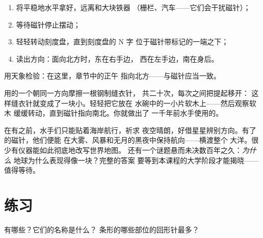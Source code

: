 \begin{method}[使用指南针]\label{met:g4:magnets-and-compass:use}
\begin{enumerate}
  \item 将平稳地水平拿好，远离和大块铁器
        （栅栏、汽车——它们会干扰磁针）；
  \item 等待磁针停止摆动；
  \item 轻轻转动刻度盘，直到刻度盘的 N 字
        位于磁针带标记的一端之下；
  \item 读出方向：面向北方时，东在右手边，
        西在左手边，南在身后。
\end{enumerate}
用天象检验：在这里，章节中的正午
指向北方——与磁针应当一致。
\end{method}

\begin{example}[自己动手做一个]\label{ex:g4:magnets-and-compass:make}
用的一个朝同一方向摩擦一根钢制缝衣针，
共二十次，每次之间把提起移开：
这样缝衣针就变成了一块小。轻轻把它放在
水碗中的一小片软木上——然后观察软木
缓缓转动，直到磁针指向南北。你就做出了
一千年前水手使用的。
\end{example}

\begin{remark}[开辟大洋的仪器]\label{rem:g4:magnets-and-compass:history}
在有之前，水手们只能贴着海岸航行，祈求
夜空晴朗，好借星星辨别方向。有了的磁针，他们便能
在大雾、风暴和无月的黑夜中保持航向——横渡整个
大洋。很少有仪器能如此彻底地改写世界地图。
还有一个谜题悬而未决数百年之久：\emph{为什么}
地球为什么表现得像一块？完整的答案
要等到本课程的大学阶段才能揭晓——值得等待。
\end{remark}

\section{练习}

\begin{exercise}[$\star$]\label{exo:g4:magnets-and-compass:1}
有哪些？它们的名称是什么？
条形的哪些部位的回形针最多？
\end{exercise}


